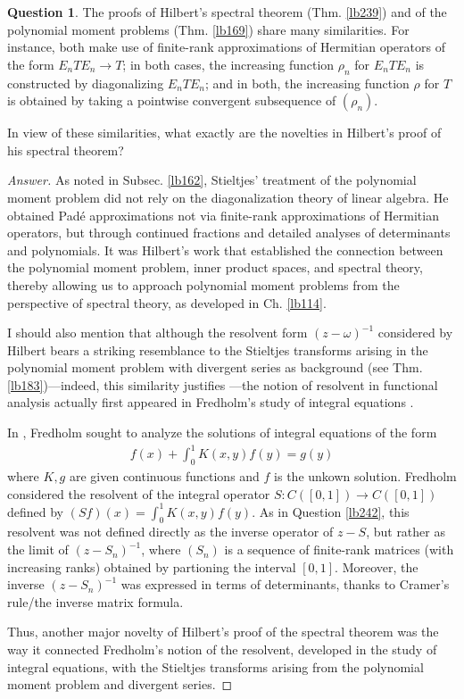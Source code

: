 \documentclass[12pt,b5paper,notitlepage]{article}
\theoremstyle{definition}
\newtheorem{question}[df]{Question}
\theoremstyle{plain}
\numberwithin{equation}{section}
\begin{document}
\begin{question}\label{lb243}
The proofs of Hilbert's spectral theorem (Thm. \ref{lb239}) and of the polynomial moment problems (Thm. \ref{lb169}) share many similarities. For instance, both make use of finite-rank approximations of Hermitian operators of the form $E_nTE_n\rightarrow T$; in both cases, the increasing function $\rho_n$ for $E_nTE_n$ is constructed by diagonalizing $E_nTE_n$; and in both, the increasing function $\rho$ for $T$ is obtained by taking a pointwise convergent subsequence of $(\rho_n)$. 

In view of these similarities, what exactly are the novelties in Hilbert’s proof of his spectral theorem?
\end{question}


\begin{proof}[Answer]
As noted in Subsec. \ref{lb162}, Stieltjes' treatment of the polynomial moment problem did not rely on the diagonalization theory of linear algebra. He obtained Pad\'e approximations not via finite-rank approximations of Hermitian operators, but through continued fractions and detailed analyses of determinants and polynomials. It was Hilbert's work that established the connection between the polynomial moment problem, inner product spaces, and spectral theory, thereby allowing us to approach polynomial moment problems from the perspective of spectral theory, as developed in Ch. \ref{lb114}.

I should also mention that although the resolvent form $(z-\omega)^{-1}$ considered by Hilbert bears a striking resemblance to the Stieltjes transforms arising in the polynomial moment problem with divergent series as background (see Thm. \ref{lb183})---indeed, this similarity justifies ---the notion of resolvent in functional analysis actually first appeared in Fredholm's study of integral equations \cite{Fre03}. 

In \cite{Fre03}, Fredholm sought to analyze the solutions of integral equations of the form
\begin{align*}
f(x)+\int_0^1K(x,y)f(y)=g(y)
\end{align*}
where $K,g$ are given continuous functions and $f$ is the unkown solution. Fredholm considered the resolvent of the integral operator $S:C([0,1])\rightarrow C([0,1])$ defined by $(Sf)(x)=\int_0^1K(x,y)f(y)$. As in Question \ref{lb242}, this resolvent was not defined directly as the inverse operator of $z-S$, but rather as the limit of $(z-S_n)^{-1}$, where $(S_n)$ is a sequence of finite-rank matrices (with increasing ranks) obtained by partioning the interval $[0,1]$. Moreover, the inverse $(z-S_n)^{-1}$ was expressed in terms of determinants, thanks to Cramer's rule/the inverse matrix formula.

Thus, another major novelty of Hilbert’s proof of the spectral theorem was the way it connected Fredholm’s notion of the resolvent, developed in the study of integral equations, with the Stieltjes transforms arising from the polynomial moment problem and divergent series.
\end{proof}
\end{document}

